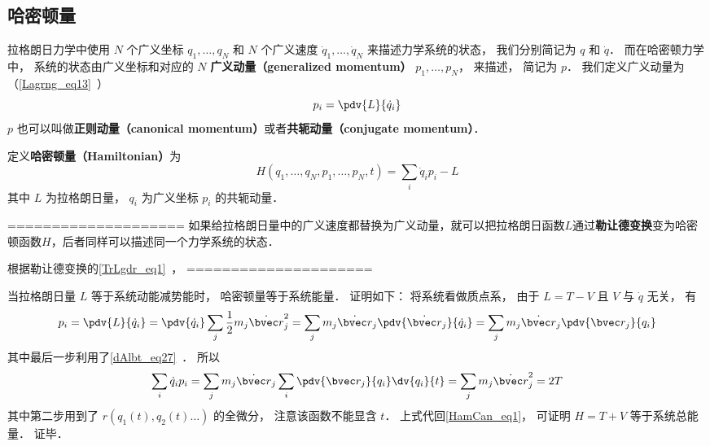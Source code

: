 

\subsection{哈密顿量}
拉格朗日力学中使用 $N$ 个广义坐标 $q_1,\dots,q_N$ 和 $N$ 个广义速度 $\dot q_1,\dots,\dot q_N$ 来描述力学系统的状态， 我们分别简记为 $q$ 和 $\dot q$． 而在哈密顿力学中， 系统的状态由广义坐标和对应的 $N$ \textbf{广义动量（generalized momentum）} $p_1, \dots, p_N$， 来描述， 简记为 $p$． 我们定义广义动量为（\autoref{Lagrng_eq13}~）
\begin{equation}
p_i = \pdv{L}{\dot q_i}
\end{equation}
$p$ 也可以叫做\textbf{正则动量（canonical momentum）}或者\textbf{共轭动量（conjugate momentum）}．

定义\textbf{哈密顿量（Hamiltonian）}为
\begin{equation}\label{HamCan_eq1}
H(q_1, \dots, q_N, p_1, \dots, p_N, t) = \sum_i \dot q_i p_i - L
\end{equation}
其中 $L$ 为拉格朗日量， $q_i$ 为广义坐标 $p_i$ 的共轭动量．

====================
如果给拉格朗日量中的广义速度都替换为广义动量，就可以把拉格朗日函数$L$通过\textbf{勒让德变换}变为哈密顿函数$H$，后者同样可以描述同一个力学系统的状态．

根据勒让德变换的\autoref{TrLgdr_eq1}~，
=====================

当拉格朗日量 $L$ 等于系统动能减势能时， 哈密顿量等于系统能量． 证明如下： 将系统看做质点系， 由于 $L = T - V$ 且 $V$ 与 $\dot q$ 无关， 有
\begin{equation}
p_i = \pdv{L}{\dot q_i} = \pdv{\dot q_i} \sum_j \frac12 m_j \dot{\bvec r}_j^2
= \sum_j m_j \dot{\bvec r}_j \pdv{\dot{\bvec r}_j}{\dot q_i}
= \sum_j m_j \dot{\bvec r}_j  \pdv{\bvec r_j}{q_i}
\end{equation}
其中最后一步利用了\autoref{dAlbt_eq27}~． 所以
\begin{equation}
 \sum_i \dot q_i p_i = \sum_j m_j \dot{\bvec r}_j \sum_i \pdv{\bvec r_j}{q_i}\dv{q_i}{t}
= \sum_j m_j \dot{\bvec r}_j^2 = 2T
\end{equation}
其中第二步用到了 $r(q_1(t), q_2(t) \dots)$ 的全微分， 注意该函数不能显含 $t$．%
上式代回\autoref{HamCan_eq1}， 可证明 $H = T + V$ 等于系统总能量． 证毕．

